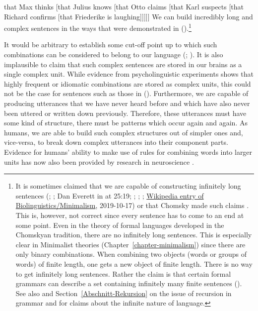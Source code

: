 \ea
\label{ex-that-max-thinks-that-recursion}
that Max thinks [that Julius knows [that Otto claims [that Karl suspects [that Richard confirms [that Friederike is laughing]]]]]
\z
\largerpage[2]
\noindent
We can build incredibly long and complex sentences in the ways that were demonstrated in ().\footnote{%
 It is sometimes claimed that we are capable of constructing infinitely long sentences (\citealp*[]{NKN2001a}; \citealp[]{KS2008a-u}; Dan Everett in  at 25:19;
 \citealp*[]{Chesi2015a-u}; \citealp[]{Lin2017a}; \citealp[]{Martorell2018a};
 \href{https://en.wikipedia.org/wiki/Biolinguistics\#Minimalist_Program}{Wikipedia entry of
   Biolinguistics/Minimalism}, 2019-10-17)
 or that Chomsky made such claims \citep[]{Leiss2003a}. This
 is, however, not correct since every sentence has to come to an end at some point. Even in the theory of formal languages developed in the Chomskyan
tradition, there are no infinitely long sentences. This is especially clear in Minimalist theories
(Chapter~\ref{chapter-minimalism}) since there are only binary combinations. When combining two
objects (words or groups of words) of finite length, one gets a new object of finite length. There is no way to get
infinitely long sentences. Rather the claim is that certain formal grammars can describe a
set containing infinitely many finite sentences (\citealp[]{Chomsky57a}). See also  and
 Section~\ref{Abschnitt-Rekursion} on the issue of recursion in grammar and for claims about the
 infinite nature of language.}


It would be arbitrary to establish some cut-off point up to which such combinations can
be considered to belong to our language (\citealp[]{Harris57a}; \citealp[]{Chomsky57a}). 
It is also implausible to claim that such complex sentences are stored in our brains as a single complex
unit. While evidence from psycholinguistic experiments shows that highly frequent or
idiomatic combinations are stored as complex units, this could not be the case for sentences such as
those in (). Furthermore, we are capable of producing utterances that we have never heard
before and which have also never been uttered or written down previously. Therefore, these utterances
must have some kind of structure, there must be patterns which occur again and again. As humans, we
are able to build such complex structures out of simpler ones and, vice-versa, to break down 
complex utterances into their component parts. Evidence for humans' ability to make use of rules for combining
words into larger units has now also been provided by research in neuroscience \citep[]{Pulvermueller2010a}.

